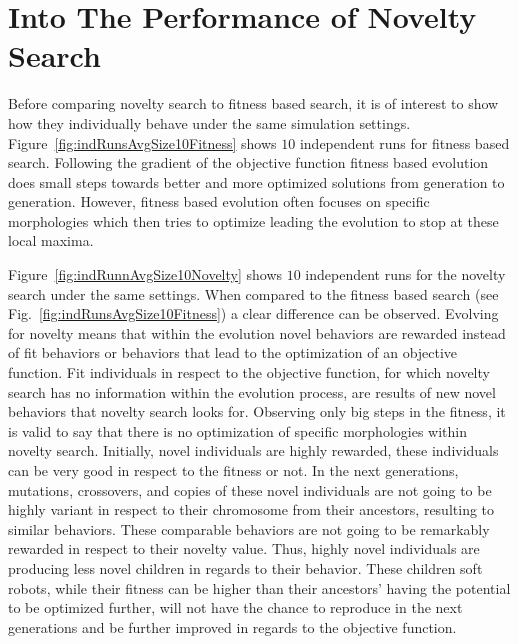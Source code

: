 \section{Into The Performance of Novelty Search}

Before comparing novelty search to fitness based search, it is of interest to show how they individually behave under the same simulation settings. Figure~\ref{fig:indRunsAvgSize10Fitness} shows $10$ independent runs for fitness based search. Following the gradient of the objective function fitness based evolution does small steps towards better and more optimized solutions from generation to generation. However, fitness based evolution often focuses on specific morphologies which then tries to optimize leading the evolution to stop at these local maxima.

Figure~\ref{fig:indRunnAvgSize10Novelty} shows $10$ independent runs for the novelty search under the same settings. When compared to the fitness based search (see Fig.~\ref{fig:indRunsAvgSize10Fitness}) a clear difference can be observed. Evolving for novelty means that within the evolution novel behaviors are rewarded instead of fit behaviors or behaviors that lead to the optimization of an objective function. Fit individuals in respect to the objective function, for which novelty search has no information within the evolution process, are results of new novel behaviors that novelty search looks for. Observing only big steps in the fitness, it is valid to say that there is no optimization of specific morphologies within novelty search. Initially, novel individuals are highly rewarded, these individuals can be very good in respect to the fitness or not. In the next generations, mutations, crossovers, and copies of these novel individuals are not going to be highly variant in respect to their chromosome from their ancestors, resulting to similar behaviors. These comparable behaviors are not going to be remarkably rewarded in respect to their novelty value. Thus, highly novel individuals are producing less novel children in regards to their behavior. These children soft robots, while their fitness can be higher than their ancestors' having the potential to be optimized further, will not have the chance to reproduce in the next generations and be further improved in regards to the objective function.

